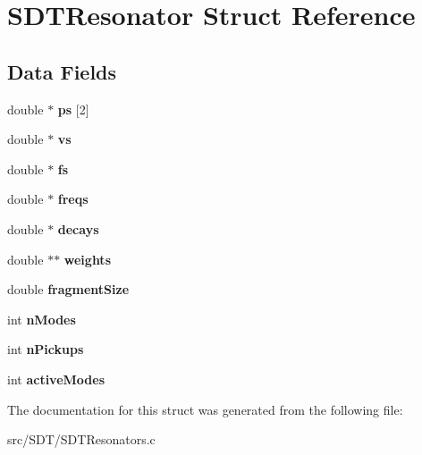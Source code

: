 \hypertarget{struct_s_d_t_resonator}{}\section{S\+D\+T\+Resonator Struct Reference}
\label{struct_s_d_t_resonator}
\subsection*{Data Fields}
\begin{DoxyCompactItemize}
\item 
\hypertarget{struct_s_d_t_resonator_a3edbce5b5724f223e322782b8661667f}{}double $\ast$ {\bfseries ps} \mbox{[}2\mbox{]}\label{struct_s_d_t_resonator_a3edbce5b5724f223e322782b8661667f}

\item 
\hypertarget{struct_s_d_t_resonator_a9d6a11a8d29d8088306919dd5ea54715}{}double $\ast$ {\bfseries vs}\label{struct_s_d_t_resonator_a9d6a11a8d29d8088306919dd5ea54715}

\item 
\hypertarget{struct_s_d_t_resonator_a5c45fcca7be3d315364f97467d54d75b}{}double $\ast$ {\bfseries fs}\label{struct_s_d_t_resonator_a5c45fcca7be3d315364f97467d54d75b}

\item 
\hypertarget{struct_s_d_t_resonator_ae80bee8e0ddb2d91ab8a101d0cd69b2b}{}double $\ast$ {\bfseries freqs}\label{struct_s_d_t_resonator_ae80bee8e0ddb2d91ab8a101d0cd69b2b}

\item 
\hypertarget{struct_s_d_t_resonator_a726573d42f0c39c0d57ea6c73a3c1312}{}double $\ast$ {\bfseries decays}\label{struct_s_d_t_resonator_a726573d42f0c39c0d57ea6c73a3c1312}

\item 
\hypertarget{struct_s_d_t_resonator_a2a202e49c8063adec7634b15f691fbb1}{}double $\ast$$\ast$ {\bfseries weights}\label{struct_s_d_t_resonator_a2a202e49c8063adec7634b15f691fbb1}

\item 
\hypertarget{struct_s_d_t_resonator_a9d63554896a3857fbd74343d213f2351}{}double {\bfseries fragment\+Size}\label{struct_s_d_t_resonator_a9d63554896a3857fbd74343d213f2351}

\item 
\hypertarget{struct_s_d_t_resonator_a2b3c5fa960a5a62e0e507bde2cd1b230}{}int {\bfseries n\+Modes}\label{struct_s_d_t_resonator_a2b3c5fa960a5a62e0e507bde2cd1b230}

\item 
\hypertarget{struct_s_d_t_resonator_ad485f7360e55a5d8b156e267c7a4c688}{}int {\bfseries n\+Pickups}\label{struct_s_d_t_resonator_ad485f7360e55a5d8b156e267c7a4c688}

\item 
\hypertarget{struct_s_d_t_resonator_a6853882bf3515784a5bc58fa9aacff48}{}int {\bfseries active\+Modes}\label{struct_s_d_t_resonator_a6853882bf3515784a5bc58fa9aacff48}

\end{DoxyCompactItemize}


The documentation for this struct was generated from the following file\+:\begin{DoxyCompactItemize}
\item 
src/\+S\+D\+T/S\+D\+T\+Resonators.\+c\end{DoxyCompactItemize}
